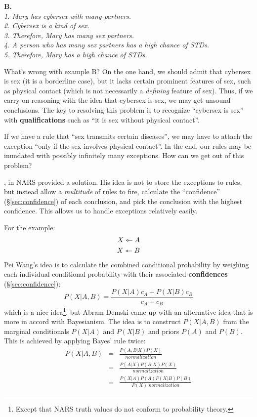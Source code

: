 \textbf{B.}\\
\textit{
1. Mary has cybersex with many partners.\\
2. Cybersex is a kind of sex.\\
3. Therefore, Mary has many sex partners.\\
4. A person who has many sex partners has a high chance of STDs.\\
5. Therefore, Mary has a high chance of STDs.}

What's wrong with example B?  On the one hand, we should admit that cybersex is sex (it is a borderline case), but it lacks certain prominent features of sex, such as physical contact (which is not necessarily a \textit{defining} feature of sex).  Thus, if we carry on reasoning with the idea that cybersex is sex, we may get unsound conclusions.  The key to resolving this problem is to recognize ``cybersex is sex'' with \textbf{qualifications} such as ``it is sex without physical contact''.

If we have a rule that ``sex transmits certain diseases'', we may have to attach the exception ``only if the sex involves physical contact''.  In the end, our rules may be inundated with possibly infinitely many exceptions.  How can we get out of this problem?

\citep*{Wang1994}, \citep*{Wang2006} in NARS provided a solution.  His idea is not to store the exceptions to rules, but instead allow a \textit{multitude} of rules to fire, calculate the ``confidence'' (\S\ref{sec:confidence}) of each conclusion, and pick the conclusion with the highest confidence.  This allows us to handle exceptions relatively easily.

For the example:
\begin{eqnarray}
X \leftarrowtriangle A \nonumber \\
X \leftarrowtriangle B \nonumber
\end{eqnarray}
Pei Wang's idea is to calculate the combined conditional probability by weighing each individual conditional probability with their associated \textbf{confidences} (\S\ref{sec:confidence}):
$$ P(X|A,B) = \frac{ P(X|A)c_A + P(X|B)c_B }{ c_A + c_B } $$
which is a nice idea\footnote{Except that NARS truth values do not conform to probability theory.}, but Abram Demski came up with an alternative idea that is more in accord with Bayesianism.  The idea is to construct $P(X|A,B)$ from the marginal conditionals $P(X|A)$ and $P(X|B)$ and priors $P(A)$ and $P(B)$.  This is achieved by applying Bayes' rule twice:
\begin{eqnarray}
P(X|A,B) &=& \frac{P(A,B|X)P(X)}{normalization} \nonumber \\
         &=& \frac{P(A|X)P(B|X)P(X)}{normalization} \nonumber \\
         &=& \frac{P(X|A)P(A)P(X|B)P(B)}{P(X) \; normalization}
\end{eqnarray}

